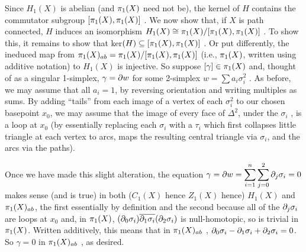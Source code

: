 \vfill
\eject

Since $H_1(X)$ is abelian (and $\pi_1(X)$ need not be), the kernel of $H$ contains the
commutator subgroup $[\pi_1(X),\pi_1(X)]$ . 
We now show that, if $X$ is path connected,
$H$ induces an isomorphism $H_1(X) \cong \pi_1(X)/[\pi_1(X),\pi_1(X)]$ . 
To show this, it remains to show that  ker$(H)\subseteq [\pi_1(X),\pi_1(X)]$ . 
Or put differently, the ineduced map from $\pi_1(X)_{ab} = \pi_1(X)/[\pi_1(X),\pi_1(X)]$ 
(i.e., $\pi_1(X)$, written using additive notation) to $H_1(X)$  is injective.
So suppose $[\gamma]\in \pi_1(X)$ and, thought of as a singular 1-simplex, 
$\gamma = \partial w$ for some 2-simplex $w=\sum a_i\sigma_i^2$ . 
As before, we may assume that all $a_i=1$, by reversing orientation and writing multiples as 
sums. By adding ``tails'' from each image of a vertex of each $\sigma_i^2$ to our chosen 
basepoint $x_0$, we may assume that the image of every face of $\Delta^2$, under
the $\sigma_i$ , is a loop at $x_0$ (by essentially replacing each $\sigma_i$ with a $\tau_i$
which first collapses little triangle at each vertex to arcs, maps the resulting central triangle
via $\sigma_i$, and the arcs via the paths). 

\ssk

Once we have made this slight alteration, the equation
$\displaystyle \gamma = \partial w = \sum_{i=1}^n \sum_{j=0}^2 \partial_j \sigma_i = 0$
makes sense (and is true) in both ($C_1(X)$ hence $Z_1(X)$ hence) $H_1(X)$ and
$\pi_1(X)_{ab}$, the first essentially by definition and the second because 
all of the $\partial_j \sigma_i$ are loops at $x_0$ and, in 
$\pi_1(X)$, $(\partial_0\sigma_i)\overline{\partial_1\sigma_i}(\partial_2\sigma_i)$ is null-homotopic,
so is trivial in $\pi_1(X)$. Written additively, this means that in
$\pi_1(X)_{ab}$ , $\partial_0\sigma_i - \partial_1\sigma_i + \partial_2\sigma_i = 0$. 
So $\gamma = 0$ in $\pi_1(X)_{ab}$ , as desired.


\vfill
\eject

